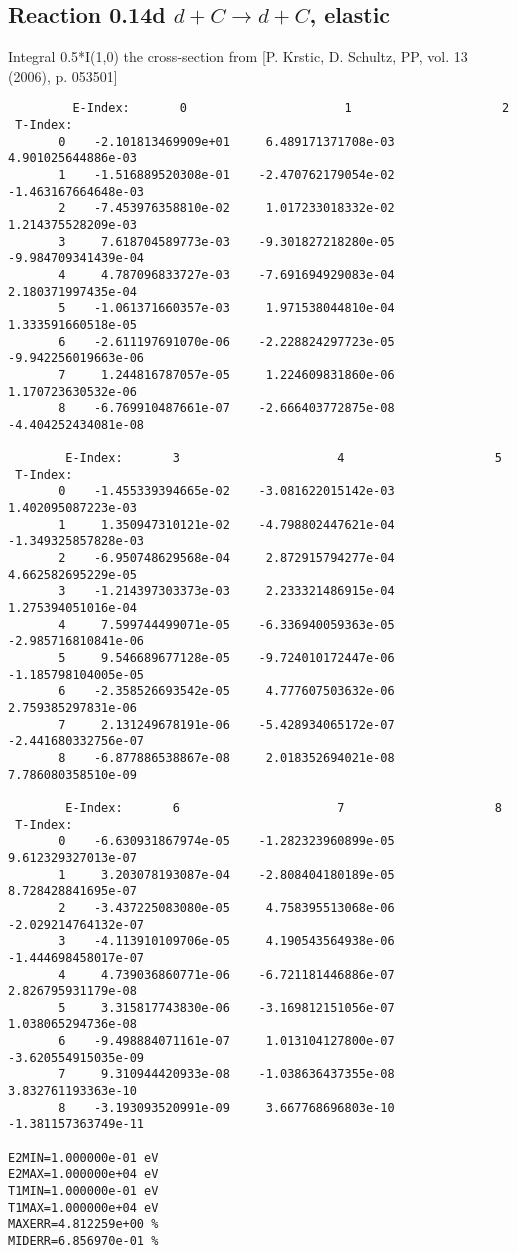 \documentclass[12pt,dvipdfmx]{article}
\begin{document}
\subsection{
Reaction 0.14d  $d + C \rightarrow d + C$, elastic}

Integral 0.5*I(1,0) the cross-section from [P. Krstic, D. Schultz, PP, vol. 13 (2006), p. 053501]

\begin{small}\begin{verbatim}
         E-Index:       0                      1                     2
 T-Index:
       0    -2.101813469909e+01     6.489171371708e-03     4.901025644886e-03
       1    -1.516889520308e-01    -2.470762179054e-02    -1.463167664648e-03
       2    -7.453976358810e-02     1.017233018332e-02     1.214375528209e-03
       3     7.618704589773e-03    -9.301827218280e-05    -9.984709341439e-04
       4     4.787096833727e-03    -7.691694929083e-04     2.180371997435e-04
       5    -1.061371660357e-03     1.971538044810e-04     1.333591660518e-05
       6    -2.611197691070e-06    -2.228824297723e-05    -9.942256019663e-06
       7     1.244816787057e-05     1.224609831860e-06     1.170723630532e-06
       8    -6.769910487661e-07    -2.666403772875e-08    -4.404252434081e-08

        E-Index:       3                      4                     5
 T-Index:
       0    -1.455339394665e-02    -3.081622015142e-03     1.402095087223e-03
       1     1.350947310121e-02    -4.798802447621e-04    -1.349325857828e-03
       2    -6.950748629568e-04     2.872915794277e-04     4.662582695229e-05
       3    -1.214397303373e-03     2.233321486915e-04     1.275394051016e-04
       4     7.599744499071e-05    -6.336940059363e-05    -2.985716810841e-06
       5     9.546689677128e-05    -9.724010172447e-06    -1.185798104005e-05
       6    -2.358526693542e-05     4.777607503632e-06     2.759385297831e-06
       7     2.131249678191e-06    -5.428934065172e-07    -2.441680332756e-07
       8    -6.877886538867e-08     2.018352694021e-08     7.786080358510e-09

        E-Index:       6                      7                     8
 T-Index:
       0    -6.630931867974e-05    -1.282323960899e-05     9.612329327013e-07
       1     3.203078193087e-04    -2.808404180189e-05     8.728428841695e-07
       2    -3.437225083080e-05     4.758395513068e-06    -2.029214764132e-07
       3    -4.113910109706e-05     4.190543564938e-06    -1.444698458017e-07
       4     4.739036860771e-06    -6.721181446886e-07     2.826795931179e-08
       5     3.315817743830e-06    -3.169812151056e-07     1.038065294736e-08
       6    -9.498884071161e-07     1.013104127800e-07    -3.620554915035e-09
       7     9.310944420933e-08    -1.038636437355e-08     3.832761193363e-10
       8    -3.193093520991e-09     3.667768696803e-10    -1.381157363749e-11

E2MIN=1.000000e-01 eV
E2MAX=1.000000e+04 eV
T1MIN=1.000000e-01 eV
T1MAX=1.000000e+04 eV
MAXERR=4.812259e+00 %
MIDERR=6.856970e-01 %
\end{verbatim}\end{small}
\newpage
\end{document}
